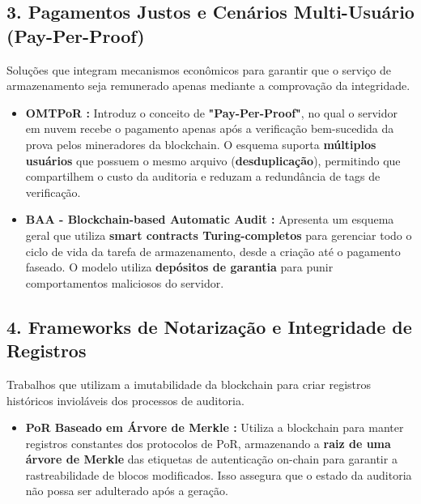 \subsection*{3. Pagamentos Justos e Cenários Multi-Usuário (Pay-Per-Proof)}
Soluções que integram mecanismos econômicos para garantir que o serviço de armazenamento seja remunerado apenas mediante a comprovação da integridade.
\begin{itemize}
    \item \textbf{OMTPoR \cite{cui2024payperproof}:} Introduz o conceito de \textbf{"Pay-Per-Proof"}, no qual o servidor em nuvem recebe o pagamento apenas após a verificação bem-sucedida da prova pelos mineradores da blockchain.
    O esquema suporta \textbf{múltiplos usuários} que possuem o mesmo arquivo (\textbf{desduplicação}), permitindo que compartilhem o custo da auditoria e reduzam a redundância de tags de verificação.
    \item \textbf{BAA - Blockchain-based Automatic Audit \cite{chen2024general}:} Apresenta um esquema geral que utiliza \textbf{smart contracts Turing-completos} para gerenciar todo o ciclo de vida da tarefa de armazenamento, desde a criação até o pagamento faseado.
    O modelo utiliza \textbf{depósitos de garantia} para punir comportamentos maliciosos do servidor.
\end{itemize}

\subsection*{4. Frameworks de Notarização e Integridade de Registros}
Trabalhos que utilizam a imutabilidade da blockchain para criar registros históricos invioláveis dos processos de auditoria.
\begin{itemize}
    \item \textbf{PoR Baseado em Árvore de Merkle \cite{ren2022blockchain}:} Utiliza a blockchain para manter registros constantes dos protocolos de PoR, armazenando a \textbf{raiz de uma árvore de Merkle} das etiquetas de autenticação on-chain para garantir a rastreabilidade de blocos modificados.
    Isso assegura que o estado da auditoria não possa ser adulterado após a geração.
\end{itemize}
